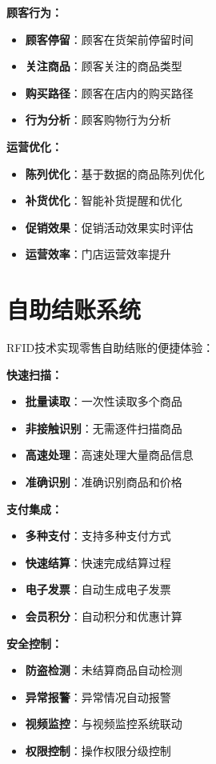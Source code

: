 \documentclass[12pt,UTF8]{ctexbook}
\begin{document}
\begin{itemize}[leftmargin=3.5em]
\begin{itemize}[leftmargin=3.5em]
\begin{itemize}[leftmargin=3.5em]
\textbf{顾客行为：}
\begin{itemize}[leftmargin=3.5em]
    \item \textbf{顾客停留}：顾客在货架前停留时间
    \item \textbf{关注商品}：顾客关注的商品类型
    \item \textbf{购买路径}：顾客在店内的购买路径
    \item \textbf{行为分析}：顾客购物行为分析
\end{itemize}

\textbf{运营优化：}
\begin{itemize}[leftmargin=3.5em]
    \item \textbf{陈列优化}：基于数据的商品陈列优化
    \item \textbf{补货优化}：智能补货提醒和优化
    \item \textbf{促销效果}：促销活动效果实时评估
    \item \textbf{运营效率}：门店运营效率提升
\end{itemize}

\section{自助结账系统}

RFID技术实现零售自助结账的便捷体验：

\textbf{快速扫描：}
\begin{itemize}[leftmargin=3.5em]
    \item \textbf{批量读取}：一次性读取多个商品
    \item \textbf{非接触识别}：无需逐件扫描商品
    \item \textbf{高速处理}：高速处理大量商品信息
    \item \textbf{准确识别}：准确识别商品和价格
\end{itemize}

\textbf{支付集成：}
\begin{itemize}[leftmargin=3.5em]
    \item \textbf{多种支付}：支持多种支付方式
    \item \textbf{快速结算}：快速完成结算过程
    \item \textbf{电子发票}：自动生成电子发票
    \item \textbf{会员积分}：自动积分和优惠计算
\end{itemize}

\textbf{安全控制：}
\begin{itemize}[leftmargin=3.5em]
    \item \textbf{防盗检测}：未结算商品自动检测
    \item \textbf{异常报警}：异常情况自动报警
    \item \textbf{视频监控}：与视频监控系统联动
    \item \textbf{权限控制}：操作权限分级控制
\end{itemize}


\end{itemize}
\end{itemize}
\end{itemize}
\end{document}
